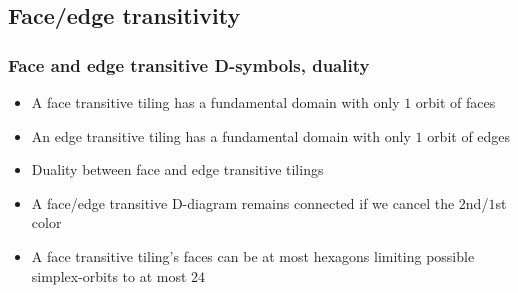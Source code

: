 \subsection{Face/edge transitivity}
\begin{frame}
  \frametitle{Face and edge transitive D-symbols, duality}
  \begin{itemize}
    \item A face transitive tiling has a fundamental domain with only $1$ orbit
      of faces
    \item An edge transitive tiling has a fundamental domain with only $1$ orbit
      of edges
    \item Duality between face and edge transitive tilings
    \item A face/edge transitive D-diagram remains connected if we cancel the
      $2$nd/$1$st color 
    \item A face transitive tiling's faces can be at most hexagons limiting
      possible simplex-orbits to at most $24$  
  \end{itemize}
\end{frame}

